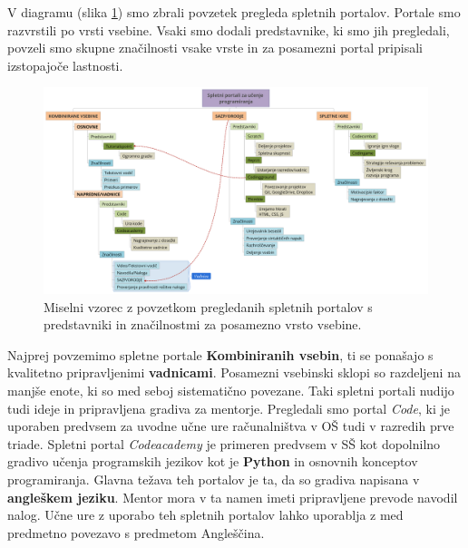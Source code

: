 V diagramu (slika \ref{fig:spup_povzetek}) smo zbrali povzetek
pregleda spletnih portalov. Portale smo razvrstili po vrsti
vsebine. Vsaki smo dodali predstavnike, ki smo jih pregledali, povzeli
smo skupne značilnosti vsake vrste in za posamezni portal pripisali
izstopajoče lastnosti.

\begin{figure}[h!]
  \centering
    \includegraphics [width=1\linewidth, keepaspectratio =
   1] {./images/SPUP_povzetek-xmind.png}
   \caption{Miselni vzorec z povzetkom pregledanih spletnih portalov s
   predstavniki in značilnostmi za posamezno vrsto vsebine.}
 \label{fig:spup_povzetek}
\end{figure}
 
Najprej povzemimo spletne portale \textbf{Kombiniranih vsebin}, ti se
ponašajo s kvalitetno pripravljenimi \textbf{vadnicami}. Posamezni
vsebinski sklopi so razdeljeni na manjše enote, ki so med seboj
sistematično povezane. Taki spletni portali nudijo tudi ideje in
pripravljena gradiva za mentorje. Pregledali smo portal \emph{Code},
ki je uporaben predvsem za uvodne učne ure računalništva v OŠ tudi v
razredih prve triade. Spletni portal \emph{Codeacademy} je primeren
predvsem v SŠ kot dopolnilno gradivo učenja programskih jezikov kot je
\textbf{Python} in osnovnih konceptov programiranja. Glavna težava teh
portalov je ta, da so gradiva napisana v \textbf{angleškem
  jeziku}. Mentor mora v ta namen imeti pripravljene prevode navodil
nalog. Učne ure z uporabo teh spletnih portalov lahko uporablja z med
predmetno povezavo s predmetom Angleščina.


